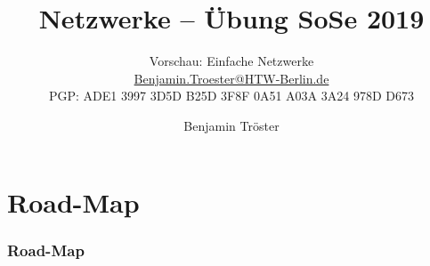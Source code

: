 \documentclass[xcolor=dvipsnames, aspectratio=169]{beamer}
\begin{document}

\title{Netzwerke -- Übung SoSe 2019}
\subtitle{Vorschau: Einfache Netzwerke\\
		\href{mailto:Benjamin.Troester@HTW-Berlin.de}{Benjamin.Troester@HTW-Berlin.de}\\
		PGP: ADE1 3997 3D5D B25D 3F8F 0A51 A03A 3A24 978D D673 }

\author{Benjamin Tröster}

\date{}

\begin{frame}
\titlepage

\end{frame}

\section*{Road-Map}
\begin{frame}
\frametitle{Road-Map}
\begin{multicols}{2}
  \tableofcontents
\end{multicols}
\end{frame}
\end{document}
